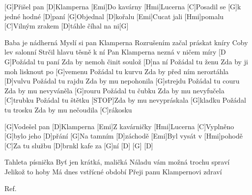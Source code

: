 
[G]Přišel pan [D]Klamperna
[Emi]Do kavárny [Hmi]Lucerna
[C]Posadil se [G]k jedné hodné [D]paní
[G]Objednal [D]kořalu
[Emi]Cucat jali [Hmi]pomalu
[C]Vilným zrakem [D]táhle číhal na ni[G]

Baba je nádherná
Myslí si pan Klamperna
Rozrušením začal práskat kníry
Coby lev salonní
Strčil hlavu těsně k ní
Pan Klamperna nezná v ničem míry
[D G]Požádal tu paní
Zda by nemoh činit soulož [D]na ní
Požádal tu ženu
Zda by ji moh lisknout po [G]vemenu
Požádal tu kurvu
Zda by před ním neroztáhla [D]vulvu
Požádal tu rajdu
Zda by mu nepohonila [G]strejdu
\slpc
[C]Požádal tu couru
Zda by mu nevyváněla [G]rouru
Požádal tu čubku
Zda by mu nevyfučela [C]trubku
Požádal tu štětku
[STOP]Zda by mu nevypráskala [G]kladku
Požádal tu trosku
Zda by mu nečoudila [C]rákosku

[G]Vodešel pan [D]Klamperna
[Emi]Z kavárničky [Hmi]Lucerna
[C]Vyplněno [G]bylo jeho [D]přání
[G]Na tamním [D]záchodě
[Emi]Byl vysát v [Hmi]pohodě
[C]Za tu službu [D]brnkl kafe za [G]ní
[D] [G] [D]

Tahleta písnička
Byť jen krátká, maličká
Náladu vám možná trochu spraví
Jelikož to hoby
Má dnes vstřícné období
Přeji panu Klampernovi zdraví

Ref.
